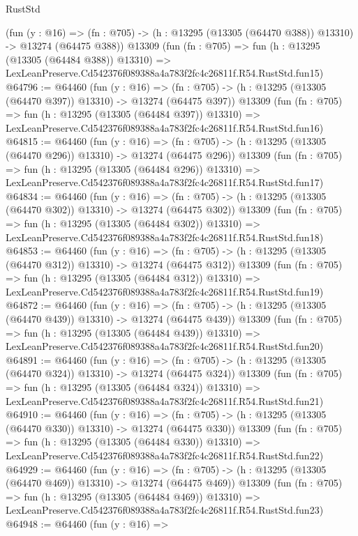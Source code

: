 \begin{lexlean}{RustStd}
\begin{coremodule}
    (fun (y : @16) =>
    (fn : @705) -> (h : @13295 (@13305 (@64470 @388)) @13310) -> @13274 (@64475 @388))
    @13309
    (fun (fn : @705) =>
    fun (h : @13295 (@13305 (@64484 @388)) @13310) =>
    LexLeanPreserve.Cd542376f089388a4a783f2fc4c26811f.R54.RustStd.fun15)
@64796 := @64460
    (fun (y : @16) =>
    (fn : @705) -> (h : @13295 (@13305 (@64470 @397)) @13310) -> @13274 (@64475 @397))
    @13309
    (fun (fn : @705) =>
    fun (h : @13295 (@13305 (@64484 @397)) @13310) =>
    LexLeanPreserve.Cd542376f089388a4a783f2fc4c26811f.R54.RustStd.fun16)
@64815 := @64460
    (fun (y : @16) =>
    (fn : @705) -> (h : @13295 (@13305 (@64470 @296)) @13310) -> @13274 (@64475 @296))
    @13309
    (fun (fn : @705) =>
    fun (h : @13295 (@13305 (@64484 @296)) @13310) =>
    LexLeanPreserve.Cd542376f089388a4a783f2fc4c26811f.R54.RustStd.fun17)
@64834 := @64460
    (fun (y : @16) =>
    (fn : @705) -> (h : @13295 (@13305 (@64470 @302)) @13310) -> @13274 (@64475 @302))
    @13309
    (fun (fn : @705) =>
    fun (h : @13295 (@13305 (@64484 @302)) @13310) =>
    LexLeanPreserve.Cd542376f089388a4a783f2fc4c26811f.R54.RustStd.fun18)
@64853 := @64460
    (fun (y : @16) =>
    (fn : @705) -> (h : @13295 (@13305 (@64470 @312)) @13310) -> @13274 (@64475 @312))
    @13309
    (fun (fn : @705) =>
    fun (h : @13295 (@13305 (@64484 @312)) @13310) =>
    LexLeanPreserve.Cd542376f089388a4a783f2fc4c26811f.R54.RustStd.fun19)
@64872 := @64460
    (fun (y : @16) =>
    (fn : @705) -> (h : @13295 (@13305 (@64470 @439)) @13310) -> @13274 (@64475 @439))
    @13309
    (fun (fn : @705) =>
    fun (h : @13295 (@13305 (@64484 @439)) @13310) =>
    LexLeanPreserve.Cd542376f089388a4a783f2fc4c26811f.R54.RustStd.fun20)
@64891 := @64460
    (fun (y : @16) =>
    (fn : @705) -> (h : @13295 (@13305 (@64470 @324)) @13310) -> @13274 (@64475 @324))
    @13309
    (fun (fn : @705) =>
    fun (h : @13295 (@13305 (@64484 @324)) @13310) =>
    LexLeanPreserve.Cd542376f089388a4a783f2fc4c26811f.R54.RustStd.fun21)
@64910 := @64460
    (fun (y : @16) =>
    (fn : @705) -> (h : @13295 (@13305 (@64470 @330)) @13310) -> @13274 (@64475 @330))
    @13309
    (fun (fn : @705) =>
    fun (h : @13295 (@13305 (@64484 @330)) @13310) =>
    LexLeanPreserve.Cd542376f089388a4a783f2fc4c26811f.R54.RustStd.fun22)
@64929 := @64460
    (fun (y : @16) =>
    (fn : @705) -> (h : @13295 (@13305 (@64470 @469)) @13310) -> @13274 (@64475 @469))
    @13309
    (fun (fn : @705) =>
    fun (h : @13295 (@13305 (@64484 @469)) @13310) =>
    LexLeanPreserve.Cd542376f089388a4a783f2fc4c26811f.R54.RustStd.fun23)
@64948 := @64460
    (fun (y : @16) =>

\end{coremodule}
\end{lexlean}
